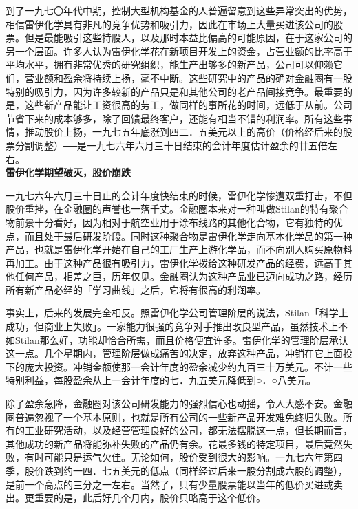 \documentclass[UTF8,a4paper,zihao=-4,fontset = windows]{ctexart} %
\begin{document}
到了一九七〇年代中期，控制大型机构基金的人普遍留意到这些异常突出的优势，相信雷伊化学具有非凡的竞争优势和吸引力，因此在市场上大量买进该公司的股票。但是最能吸引这些持股人，以及那时本益比偏高的可能原因，在于这家公司的另一个层面。许多人认为雷伊化学花在新项目开发上的资金，占营业额的比率高于平均水平，拥有非常优秀的研究组织，能生产出够多的新产品，公司可以仰赖它们，营业额和盈余将持续上扬，毫不中断。这些研究中的产品的确对金融圈有一股特别的吸引力，因为许多较新的产品只是和其他公司的老产品间接竞争。最重要的是，这些新产品能让工资很高的劳工，做同样的事所花的时间，远低于从前。公司节省下来的成本够多，除了回馈最终客户，还能有相当不错的利润率。所有这些事情，推动股价上扬，一九七五年底涨到四二．五美元以上的高价（价格经后来的股票分割调整）──是一九七六年六月三十日结束的会计年度估计盈余的廿五倍左右。
\\

\textbf{雷伊化学期望破灭，股价崩跌}


一九七六年六月三十日止的会计年度快结束的时候，雷伊化学惨遭双重打击，不但股价重挫，在金融圈的声誉也一落千丈。金融圈本来对一种叫做Stilan的特有聚合物前景十分看好，因为相对于航空业用于涂布线路的其他化合物，它有独特的优点，而且处于最后研发阶段。同时这种聚合物是雷伊化学走向基本化学品的第一种产品，也就是雷伊化学开始在自己的工厂生产上游化学品，而不向别人购买原物料再加工。由于这种产品很有吸引力，雷伊化学拨给这种研发产品的经费，远高于其他任何产品，相差之巨，历年仅见。金融圈认为这种产品业已迈向成功之路，经历所有新产品必经的「学习曲线」之后，它将有很高的利润率。

事实上，后来的发展完全相反。照雷伊化学公司管理阶层的说法，Stilan「科学上成功，但商业上失败」。一家能力很强的竞争对手推出改良型产品，虽然技术上不如Stilan那么好，功能却恰合所需，而且价格便宜许多。雷伊化学的管理阶层承认这一点。几个星期内，管理阶层做成痛苦的决定，放弃这种产品，冲销在它上面投下的庞大投资。冲销金额使那一会计年度的盈余减少约九百三十万美元。不计一些特别利益，每股盈余从上一会计年度的七．九五美元降低到○．○八美元。

除了盈余急降，金融圈对该公司研发能力的强烈信心也动摇，令人大感不安。金融圈普遍忽视了一个基本原则，也就是所有公司的一些新产品开发难免终归失败。所有的工业研究活动，以及经营管理良好的公司，都无法摆脱这一点，但长期而言，其他成功的新产品将能弥补失败的产品仍有余。花最多钱的特定项目，最后竟然失败，有时可能只是运气欠佳。无论如何，股价受到很大的影响。一九七六年第四季，股价跌到约一四．七五美元的低点（同样经过后来一股分割成六股的调整），是前一个高点的三分之一左右。当然了，只有少量股票能以当年的低价买进或卖出。更重要的是，此后好几个月内，股价只略高于这个低价。
\end{document}
